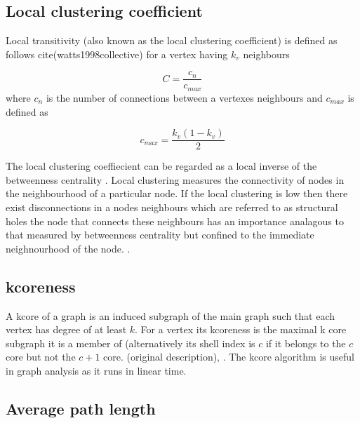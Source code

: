 \subsection{Local clustering coefficient}
\label{sec:local clustering coefficient}
Local transitivity (also known as the local clustering coefficient) is defined as  follows cite(watts1998collective) for a vertex having $k_v$ neighbours 

\begin{equation}
C = \frac{c_n}{c_{max}}
\end{equation}
where $c_n$ is the number of connections between a vertexes neighbours and $c_{max}$ is defined as 

\begin{equation}
c_{max} = \frac{k_v(1-k_v)}{2}
\end{equation}

The local clustering coeffiecient can be regarded as a local inverse of the betweenness centrality . Local clustering measures the connectivity of nodes in the neighbourhood of a particular node. If the local clustering is low then there exist disconnections in a nodes neighbours which are referred to as structural holes  the node that connects these neighbours has an importance analagous to that measured by betweenness centrality but confined to the immediate neighnourhood of the node. .






\subsection{kcoreness}

A kcore of a graph is an induced subgraph of the main graph such that each vertex has degree of at least $k$. For a vertex its kcoreness is the maximal k core subgraph it is a member of (alternatively its shell index is $c$ if it belongs to the $c$ core but not the $c+1$ core. \cite{seidman1983network} (original description), \cite{alvarez2006large}. The kcore algorithm is useful in graph analysis as it runs in linear time. 

\subsection{Average path length}
\label{sec:Centrality intro average path length}

